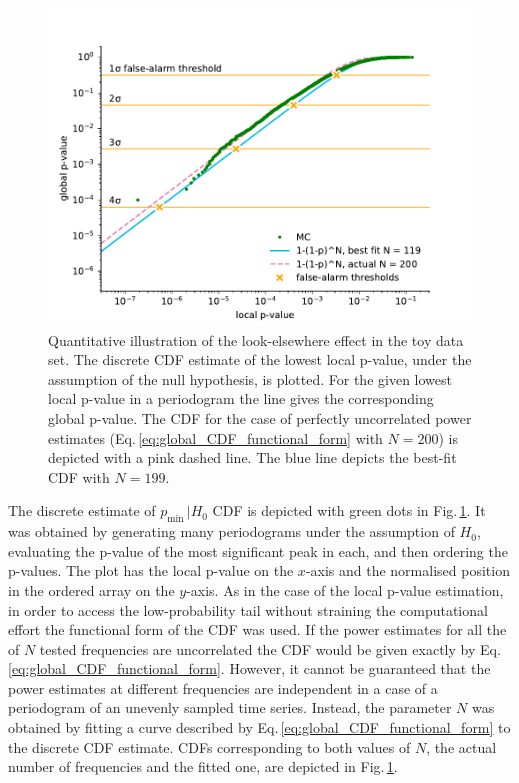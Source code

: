 \begin{figure}
  \centering
  \includegraphics[width=\linewidth]{gfx/axions/MC_estimation_global.pdf}
  \caption{Quantitative illustration of the look-elsewhere effect in the toy data set. The discrete CDF estimate of the lowest local p-value, under the assumption of the null hypothesis, is plotted. For the given lowest local p-value in a periodogram the line gives the corresponding global p-value. The CDF for the case of perfectly uncorrelated power estimates (Eq.\,\ref{eq:global_CDF_functional_form} with $N=200$) is depicted with a pink dashed line. The blue line depicts the best-fit CDF with $N=199$.
  }\label{fig:P_look-elsewhere}
\end{figure}

The discrete estimate of $p_\text{min} \, | H_0$ CDF is depicted with green dots in Fig.\,\ref{fig:P_look-elsewhere}. It was obtained by generating many periodograms under the assumption of $H_0$, evaluating the p-value of the most significant peak in each, and then ordering the p-values. The plot has the local p-value on the $x$-axis and the normalised position in the ordered array on the $y$-axis.
As in the case of the local p-value estimation, in order to access the low-probability tail without straining the computational effort the functional form of the CDF was used.
If the power estimates for all the of $N$ tested frequencies are uncorrelated the CDF would be given exactly by Eq.\,\ref{eq:global_CDF_functional_form}.
However, it cannot be guaranteed that the power estimates at different frequencies are independent in a case of a periodogram of an unevenly sampled time series.
Instead, the parameter $N$ was obtained by fitting a curve described by Eq.\,\ref{eq:global_CDF_functional_form} to the discrete CDF estimate. CDFs corresponding to both values of $N$, the actual number of frequencies and the fitted one, are depicted in Fig.\,\ref{fig:P_look-elsewhere}.

